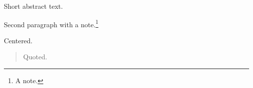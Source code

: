 \documentclass{article}
\begin{document}
\abstract
Short abstract text.

Second paragraph with a note.\footnote{A note.}

\begin{center}Centered.\end{center}

\begin{quote}Quoted.\end{quote}
\end{document}
